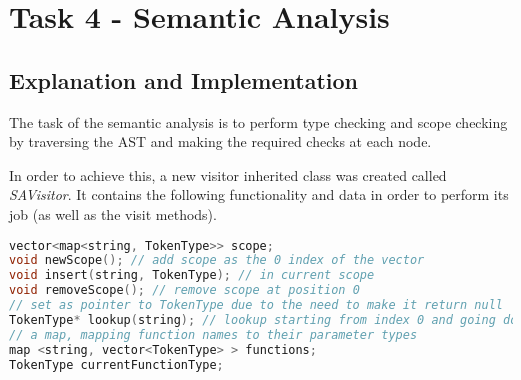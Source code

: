\section{Task 4 - Semantic Analysis}
\subsection{Explanation and Implementation}
The task of the semantic analysis is to perform type checking and scope checking by traversing the AST and making the required checks at each node.

In order to achieve this, a new visitor inherited class was created called \textit{SAVisitor}. It contains the following functionality and data in order to perform its job (as well as the visit methods).

\begin{lstlisting}[language=C++]
vector<map<string, TokenType>> scope;
void newScope(); // add scope as the 0 index of the vector
void insert(string, TokenType); // in current scope
void removeScope(); // remove scope at position 0
// set as pointer to TokenType due to the need to make it return null
TokenType* lookup(string); // lookup starting from index 0 and going down
// a map, mapping function names to their parameter types
map <string, vector<TokenType> > functions;
TokenType currentFunctionType;
\end{lstlisting}

